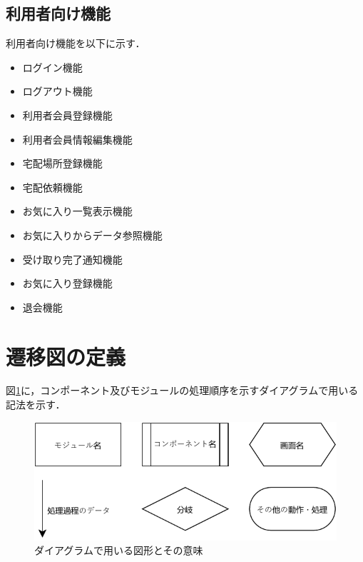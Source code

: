\documentclass[a4paper, titlepage]{jsarticle}
\begin{document}
\subsection{利用者向け機能}
利用者向け機能を以下に示す．
\begin{itemize}[labelwidth=\linewidth]
  \setlength{\leftskip}{1em}

  \item ログイン機能 %
  \item ログアウト機能 %
  \item 利用者会員登録機能 %
  \item 利用者会員情報編集機能 %
  \item 宅配場所登録機能 %
  \item 宅配依頼機能 %
  \item お気に入り一覧表示機能 %
  \item お気に入りからデータ参照機能 %
  \item 受け取り完了通知機能 %
  \item お気に入り登録機能 %
  \item 退会機能 %
\end{itemize}

\section{遷移図の定義}
図\ref{fig:def_module_diagram}に，コンポーネント及びモジュールの処理順序を示すダイアグラムで用いる記法を示す．

\begin{figure}[H]
  \centering
  \includegraphics[width=\linewidth]{fig/rule.pdf}
  \caption{ダイアグラムで用いる図形とその意味}
  \label{fig:def_module_diagram}
\end{figure}
\end{document}
